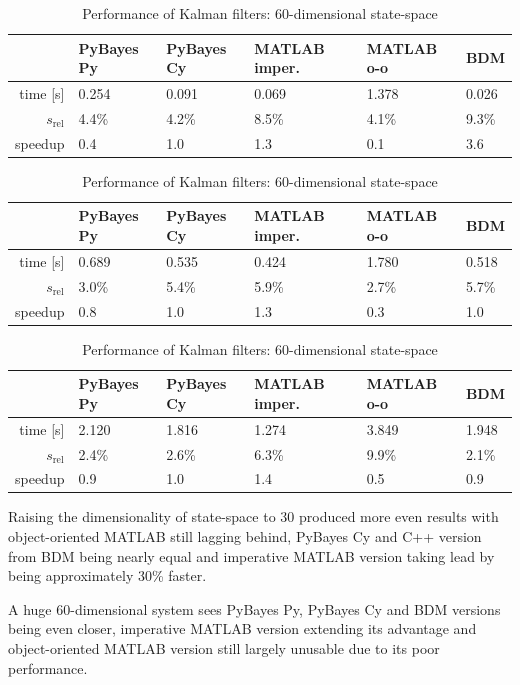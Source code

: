 \begin{table}[ht]
	\centering
	\begin{tabular}{|r|l|l|l|l|l|} \hline
		& PyBayes Py & PyBayes Cy & MATLAB imper. & MATLAB o-o & BDM \\ \hline
		time [s] & 0.254 & 0.091 & 0.069 & 1.378 & 0.026 \\ \hline
		\(s_{\text{rel}}\) & 4.4\% & 4.2\% & 8.5\% & 4.1\% & 9.3\% \\ \hline
		speedup & 0.4\x & 1.0\x & 1.3\x & 0.1\x & 3.6\x \\ \hline
	\end{tabular}
	\caption{Performance of Kalman filters: 2-dimensional state-space}
	\label{tab:KFSmall}
	\vspace{7mm}

	\begin{tabular}{|r|l|l|l|l|l|} \hline
		& PyBayes Py & PyBayes Cy & MATLAB imper. & MATLAB o-o & BDM \\ \hline
		time [s] & 0.689 & 0.535 & 0.424 & 1.780 & 0.518 \\ \hline
		\(s_{\text{rel}}\) & 3.0\% & 5.4\% & 5.9\% & 2.7\% & 5.7\% \\ \hline
		speedup & 0.8\x & 1.0\x & 1.3\x & 0.3\x & 1.0\x \\ \hline
	\end{tabular}
	\caption{Performance of Kalman filters: 30-dimensional state-space}
	\label{tab:KFBig}
	\vspace{7mm}

	\begin{tabular}{|r|l|l|l|l|l|} \hline
		& PyBayes Py & PyBayes Cy & MATLAB imper. & MATLAB o-o & BDM \\ \hline
		time [s] & 2.120 & 1.816 & 1.274 & 3.849 & 1.948 \\ \hline
		\(s_{\text{rel}}\) & 2.4\% & 2.6\% & 6.3\% & 9.9\% & 2.1\% \\ \hline
		speedup & 0.9\x & 1.0\x & 1.4\x & 0.5\x & 0.9\x \\ \hline
	\end{tabular}
	\caption{Performance of Kalman filters: 60-dimensional state-space}
	\label{tab:KFHuge}
\end{table}

Raising the dimensionality of state-space to 30 produced more even results with object-oriented
MATLAB still lagging behind, PyBayes Cy and C++ version from BDM being nearly equal and imperative
MATLAB version taking lead by being approximately 30\% faster.

A huge 60-dimensional system sees PyBayes Py, PyBayes Cy and BDM versions being even closer,
imperative MATLAB version extending its advantage and object-oriented MATLAB version still largely
unusable due to its poor performance.

